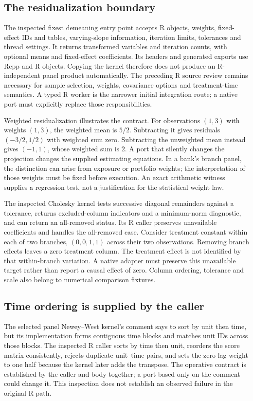 \subsection{The residualization boundary}
The inspected fixest demeaning entry point accepts R objects, weights,
fixed-effect IDs and tables, varying-slope information, iteration limits,
tolerances and thread settings. It returns transformed variables and iteration
counts, with optional means and fixed-effect coefficients. Its headers and
generated exports use Rcpp and R objects. Copying the kernel therefore does
not produce an R-independent panel product automatically. The preceding
R source review remains necessary for sample selection, weights, covariance
options and treatment-time semantics. A typed R worker is the narrower
initial integration route; a native port must explicitly replace those
responsibilities.~\citep{exec25_panelcxx_fixest,exec20_fixest_source}

Weighted residualization illustrates the contract. For observations $(1,3)$
with weights $(1,3)$, the weighted mean is $5/2$. Subtracting it gives
residuals $(-3/2,1/2)$ with weighted sum zero. Subtracting the unweighted
mean instead gives $(-1,1)$, whose weighted sum is 2. A port that silently
changes the projection changes the supplied estimating equations. In a
bank's branch panel, the distinction can arise from exposure or portfolio
weights; the interpretation of those weights must be fixed before execution.
An exact arithmetic witness supplies a regression test, not a justification
for the statistical weight law.~\citep{exec25_panelcxx_reference}

The inspected Cholesky kernel tests successive diagonal remainders against
a tolerance, returns excluded-column indicators and a minimum-norm diagnostic,
and can return an all-removed status. Its R caller preserves unavailable
coefficients and handles the all-removed case. Consider treatment constant
within each of two branches, $(0,0,1,1)$ across their two observations.
Removing branch effects leaves a zero treatment column. The treatment effect
is not identified by that within-branch variation. A native adapter must
preserve this unavailable target rather than report a causal effect of zero.
Column ordering, tolerance and scale also belong to numerical comparison
fixtures.~\citep{exec25_panelcxx_fixest,exec20_fixest_source,exec25_panelcxx_reference}

\subsection{Time ordering is supplied by the caller}
The selected panel Newey--West kernel's comment says to sort by unit then
time, but its implementation forms contiguous time blocks and matches unit
IDs across those blocks. The inspected R caller sorts by time then unit,
reorders the score matrix consistently, rejects duplicate unit--time pairs,
and sets the zero-lag weight to one half because the kernel later adds the
transpose. The operative contract is established by the caller and body
together; a port based only on the comment could change it. This inspection
does not establish an observed failure in the original R path.
\citep{exec25_panelcxx_fixest,exec20_fixest_source}

